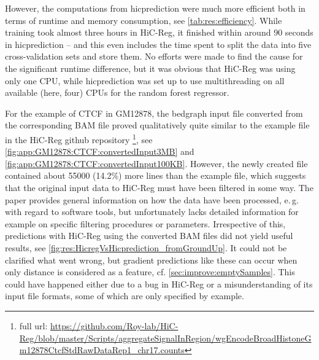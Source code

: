 However, the computations from hicprediction were much more efficient both in terms of runtime and memory consumption,
see \autoref{tab:res:efficiency}. While training took almost three hours in HiC-Reg, it finished within around 90 seconds
in hicprediction -- and this even includes the time spent to split the data into five cross-validation sets and store them.
No efforts were made to find the cause for the significant runtime difference, 
but it was obvious that HiC-Reg was using only one CPU, while hicprediction was set up to use multithreading on
all available (here, four) CPUs for the random forest regressor.
\begin{table}[htb]
\caption{computational effort HiC-Reg vs. hicprediction} \label{tab:res:efficiency}
\end{table}

For the example of CTCF in GM12878, the bedgraph input file converted from the corresponding BAM file 
proved qualitatively quite similar to the example file in the HiC-Reg github repository 
\cite{Roy2020}\footnote{full url: 
\url{https://github.com/Roy-lab/HiC-Reg/blob/master/Scripts/aggregateSignalInRegion/wgEncodeBroadHistoneGm12878CtcfStdRawDataRep1_chr17.counts}},
see \autoref{fig:app:GM12878:CTCF:convertedInput3MB} and \ref{fig:app:GM12878:CTCF:convertedInput100KB}.
However, the newly created file contained about \num{55000} (14.2\%) more lines than the example file, 
which suggests that the original input data to HiC-Reg must have been filtered in some way. 
The paper \cite{Zhang2019} provides general information on how the data have been processed,
e.\,g. with regard to software tools, but unfortunately lacks detailed information for example on specific filtering procedures or parameters.
Irrespective of this, predictions with HiC-Reg using the converted BAM files did not yield useful results, see 
\autoref{fig:res:HicregVsHicprediction_fromGroundUp}.
It could not be clarified what went wrong, 
but gradient predictions like these can occur when only distance is
considered as a feature, cf. \autoref{sec:improve:emptySamples}.
This could have happened either due to a bug in HiC-Reg 
or a misunderstanding of its input file formats, some of which are 
only specified by example.

